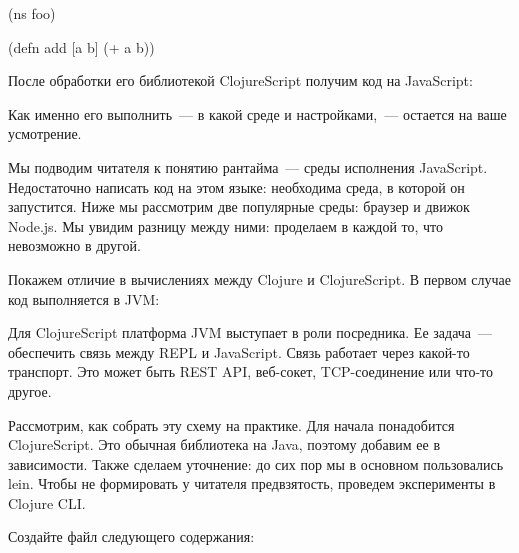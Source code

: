 \begin{english}
  \begin{clojure}
(ns foo)

(defn add [a b]
  (+ a b))
  \end{clojure}
\end{english}

После обработки его библиотекой ClojureScript получим код на JavaScript:

\begin{english}
\end{english}

Как именно его выполнить~--- в какой среде и настройками,~--- остается на ваше усмотрение.

Мы подводим читателя к понятию рантайма~--- среды исполнения JavaScript. Недостаточно написать код на этом языке: необходима среда, в которой он запустится. Ниже мы рассмотрим две популярные среды: браузер и движок Node.js. Мы увидим разницу между ними: проделаем в каждой то, что невозможно в другой.

Покажем отличие в вычислениях между Clojure и ClojureScript. В первом случае код выполняется в JVM:

\begin{figure}[H]
  \centering
  
  \label{fig:chart-repl-03}
\end{figure}

Для ClojureScript платформа JVM выступает в роли посредника. Ее задача~--- обеспечить связь между REPL и JavaScript. Связь работает через какой-то транспорт. Это может быть REST API, веб-сокет, TCP-соединение или что-то другое.

\begin{figure}[H]
  \centering
  
  \label{fig:chart-repl-04}
\end{figure}

Рассмотрим, как собрать эту схему на практике. Для начала понадобится ClojureScript. Это обычная библиотека на Java, поэтому добавим ее в зависимости. Также сделаем уточнение: до сих пор мы в основном пользовались lein. Чтобы не формировать у читателя предвзятость, проведем эксперименты в Clojure CLI.

Создайте файл  следующего содержания:

